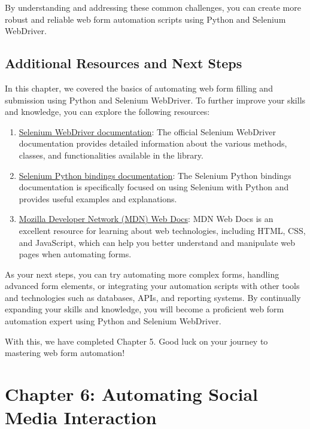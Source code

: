 \documentclass[
  paper=a4,
  ,captions=tableheading
]{scrartcl}
\providecommand{\tightlist}{%
  \setlength{\itemsep}{0pt}\setlength{\parskip}{0pt}}
\begin{document}
By understanding and addressing these common challenges, you can create
more robust and reliable web form automation scripts using Python and
Selenium WebDriver.

\hypertarget{additional-resources-and-next-steps-1}{%
\section{Additional Resources and Next
Steps}\label{additional-resources-and-next-steps-1}}

In this chapter, we covered the basics of automating web form filling
and submission using Python and Selenium WebDriver. To further improve
your skills and knowledge, you can explore the following resources:

\begin{enumerate}
\def\labelenumi{\arabic{enumi}.}
\tightlist
\item
  \href{https://www.selenium.dev/documentation/en/}{Selenium WebDriver
  documentation}: The official Selenium WebDriver documentation provides
  detailed information about the various methods, classes, and
  functionalities available in the library.
\item
  \href{https://selenium-python.readthedocs.io/}{Selenium Python
  bindings documentation}: The Selenium Python bindings documentation is
  specifically focused on using Selenium with Python and provides useful
  examples and explanations.
\item
  \href{https://developer.mozilla.org/en-US/}{Mozilla Developer Network
  (MDN) Web Docs}: MDN Web Docs is an excellent resource for learning
  about web technologies, including HTML, CSS, and JavaScript, which can
  help you better understand and manipulate web pages when automating
  forms.
\end{enumerate}

As your next steps, you can try automating more complex forms, handling
advanced form elements, or integrating your automation scripts with
other tools and technologies such as databases, APIs, and reporting
systems. By continually expanding your skills and knowledge, you will
become a proficient web form automation expert using Python and Selenium
WebDriver.

With this, we have completed Chapter 5. Good luck on your journey to
mastering web form automation!

\hypertarget{chapter-6-automating-social-media-interaction}{%
\chapter{Chapter 6: Automating Social Media
Interaction}\label{chapter-6-automating-social-media-interaction}}
\end{document}
